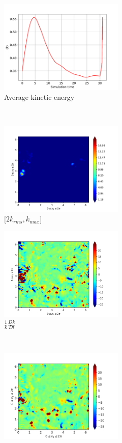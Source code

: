 \begin{figure}[H]
    \begin{subfigure}[H]{0.45\textwidth}
        \includegraphics[height=1.75in]{media/run-cds-65/ke-average1480}
        \caption{Average kinetic energy}
    \end{subfigure}
    ~
    \begin{subfigure}[H]{0.45\textwidth}
        \includegraphics[height=1.75in]{media/run-cds-65/ke-2-1480}
        \caption{$[2k_{rms}, k_{max} $] }
    \end{subfigure}
    \newline
    \begin{subfigure}[H]{0.45\textwidth}
        \includegraphics[height=1.75in]{media/run-cds-65/ke-1480}
        \caption{$\frac{1}{k} \frac{D k}{Dt}$}
    \end{subfigure}
    ~
    \begin{subfigure}{0.45\textwidth}
        \includegraphics[height=1.75in]{media/run-cds-65/A-ke-1480}

\end{subfigure}
\end{figure}
